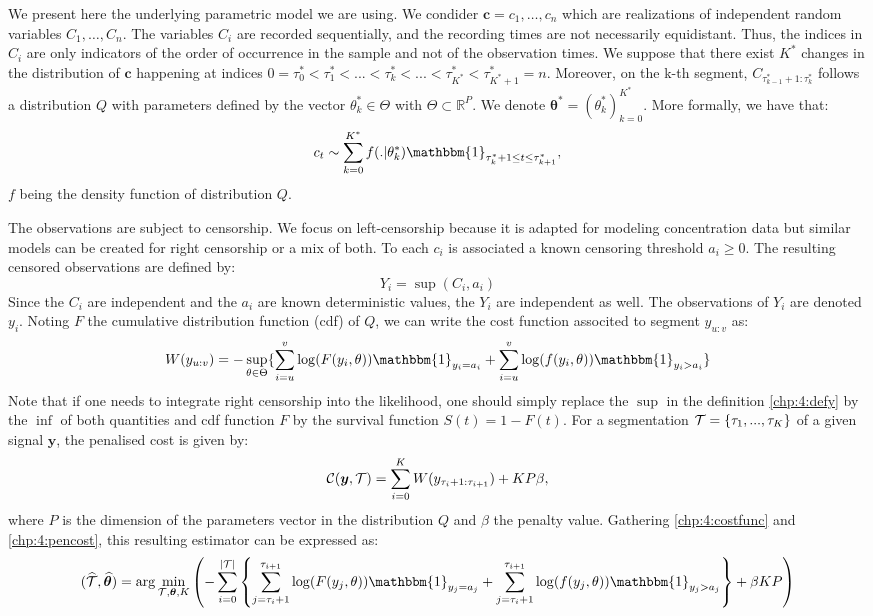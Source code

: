 We present here the underlying parametric model we are using. We condider $\bm c = c_1,\dots,c_n$ which are realizations of independent random variables $C_1,\dots,C_n$. The variables $C_i$ are recorded sequentially, and the recording times are not necessarily equidistant. Thus, the indices in $C_i$ are only indicators of the order of occurrence in the sample and not of the observation times. We suppose that there exist $K^*$ changes in the distribution of $\bm c$ happening at indices $0=\tau_0^*<\tau^*_1 <... < \tau^*_k <... < \tau^*_{K^*}<\tau^*_{K^*+1}=n$. Moreover, on the k-th segment, $C_{\tau^*_{k-1}+1:\tau^*_{k}}$ follows a distribution $Q$ with parameters defined by the vector $\theta^*_k\in\Theta$ with $\Theta\subset\mathbb{R}^P$. We denote $\bm{\theta^*} = (\theta^*_k)_{k=0}^{K^*}$. More formally, we have that:  
$$c_t \sim \sum_{k=0}^{K^*} f(.\vert\theta^*_k)\mathbbm{1}_{\tau^*_{k}+1\leq t \leq \tau^*_{k+1}},$$
$f$ being the density function of distribution $Q$.  


The observations are subject to censorship. We focus on left-censorship because it is adapted for modeling concentration data but similar models can be created for right censorship or a mix of both. To each $c_i$ is associated a known censoring threshold $a_i \ge 0$. The resulting censored observations are defined by:  
\begin{equation}\label{chp:4:defy}
Y_i = \sup(C_i,a_i)
\end{equation}
Since the $C_i$ are independent and the $a_i$ are known deterministic values, the $Y_i$ are independent as well. The observations of $Y_i$ are denoted $y_i$. Noting $F$ the cumulative distribution function (cdf) of $Q$, we can write the cost function associted to segment $y_{u:v}$ as:  
\begin{equation}\label{chp:4:costfunc}
W(y_{u:v}) = -\sup_{\theta \in \Theta}\{\sum_{i=u}^v\log(F(y_i,\theta))\mathbbm{1}_{y_i=a_i}+\sum_{i=u}^v\log(f(y_i,\theta))\mathbbm{1}_{y_i>a_i}\}
\end{equation}
Note that if one needs to integrate right censorship into the likelihood, one should simply replace the $\sup$ in the definition \ref{chp:4:defy} by the $\inf$ of both quantities and cdf function $F$ by the survival function $S(t)=1-F(t)$. 
For a segmentation ${\mathcal T} = \{\tau_1,...,\tau_K\}$ of a given signal $\bm y$, the penalised cost is given by: 
\begin{equation}\label{chp:4:pencost}
{\mathcal C}(\bm y,{\mathcal T})=\sum_{i=0}^{K}  W(y_{\tau_i+1:\tau_{i+1}}) + KP\beta,
\end{equation}
where $P$ is the dimension of the parameters vector in the distribution $Q$ and $\beta$ the penalty value. Gathering \ref{chp:4:costfunc} and \ref{chp:4:pencost}, this resulting estimator can be expressed as:  
\begin{equation}\label{chp:4:estim}
(\widehat{\TT},\widehat{\bm \theta}) = \arg\min_{\TT,\bm \theta,K} \left(- \sum_{i=0}^{\lvert \TT \rvert}  \left\{\sum_{j=\tau_i+1}^{\tau_{i+1}}\log(F(y_j,\theta))\mathbbm{1}_{y_j=a_j}+\sum_{j=\tau_i+1}^{\tau_{i+1}}\log(f(y_j,\theta))\mathbbm{1}_{y_j>a_j}\right\}+\beta KP\right)
\end{equation}


